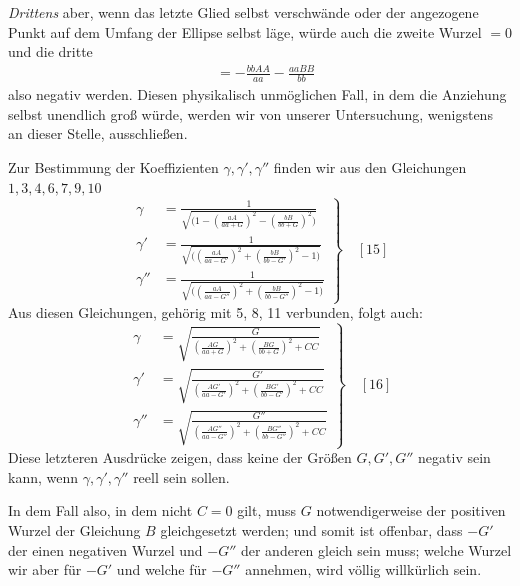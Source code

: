 \textit{Drittens} aber, wenn das letzte Glied selbst verschwände oder der angezogene Punkt auf dem Umfang der Ellipse selbst läge, würde auch die zweite Wurzel \(=0\) und die dritte
\[
\begin{aligned}
&=-\frac{bbAA}{aa}-\frac{aaBB}{bb}
\end{aligned}
\]
also negativ werden. Diesen physikalisch unmöglichen Fall, in dem die Anziehung selbst unendlich groß würde, werden wir von unserer Untersuchung, wenigstens an dieser Stelle, ausschließen.


Zur Bestimmung der Koeffizienten \(\gamma,\gamma',\gamma''\) finden wir aus den Gleichungen \(1,3,4,6,7,9,10\)
\[
\left.\begin{aligned}
\gamma&=\frac{1}{\surd{\bigl(1-(\frac{aA}{aa+G})^2-(\frac{bB}{bb+G})^2\bigr)}}\\[9pt]
\gamma'&=\frac{1}{\surd{\bigl((\frac{aA}{aa-G'})^2+(\frac{bB}{bb-G'})^2-1\bigr)}}\\[9pt]
\gamma''&=\frac{1}{\surd{\bigl((\frac{aA}{aa-G''})^2+(\frac{bB}{bb-G''})^2-1\bigr)}}
\end{aligned}\right\}\quad[15]
\]
Aus diesen Gleichungen, gehörig mit 5, 8, 11 verbunden, folgt auch:
\[
\left.\begin{aligned}
\gamma&=\surd{\frac{G}{(\frac{AG}{aa+G})^2+(\frac{BG}{bb+G})^2+CC}}\\[9pt]
\gamma'&=\surd{\frac{G'}{(\frac{AG'}{aa-G'})^2+(\frac{BG'}{bb-G'})^2+CC}}\\[9pt]
\gamma''&=\surd{\frac{G''}{(\frac{AG''}{aa-G''})^2+(\frac{BG''}{bb-G''})^2+CC}}
\end{aligned}\right\}\quad[16]
\]
Diese letzteren Ausdrücke zeigen, dass keine der Größen $G,G',G''$ negativ sein kann, wenn $\gamma,\gamma',\gamma''$ reell sein sollen.

In dem Fall also, in dem nicht $C=0$ gilt, muss $G$ notwendigerweise der positiven Wurzel der Gleichung $B$ gleichgesetzt werden; und somit ist offenbar, dass $-G'$ der einen negativen Wurzel und $-G''$ der anderen gleich sein muss; welche Wurzel wir aber für $-G'$ und welche für $-G''$ annehmen, wird völlig willkürlich sein.

